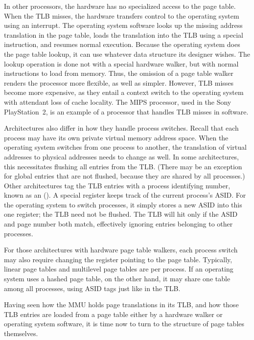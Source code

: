 In other processors, the hardware has no specialized access to the page
table.  When the TLB misses, the hardware transfers control to the
operating system using an interrupt.  The operating system software
looks up the missing address translation in the page table, loads the
translation into the TLB using a special instruction, and resumes
normal execution.  Because the operating system does the page table
lookup, it can use whatever data structure its designer wishes. The
lookup operation is done not with a special hardware walker, but with
normal instructions to load from memory.  Thus, the omission of a page
table walker renders the processor more flexible, as well as simpler.
However, TLB misses become more expensive, as they entail a context
switch to the operating system with attendant loss of cache locality.
The MIPS processor, used in the Sony PlayStation~2, is an example of
a processor that handles TLB misses in software.

Architectures also differ in how they handle process switches.  Recall
that each process may have its own private virtual memory address
space.  When the operating system switches from one process to
another, the translation of virtual addresses to physical addresses
needs to change as well.  In some architectures, this necessitates
flushing all entries from the TLB. (There may be an exception for
global entries that are not flushed, because they are shared by all
processes.)  Other architectures tag the TLB entries with a process
identifying number, known as an 
(). A special register keeps track of the current
process's ASID.  For the operating system to switch processes, it
simply stores a new ASID into this one register; the TLB need not be
flushed.  The TLB will hit only if the ASID and page number both
match, effectively ignoring entries belonging to other processes.

For those architectures with hardware page table walkers, each process
switch may also require changing the register pointing to the page
table.  Typically, linear page tables and multilevel page tables are
per process.  If an operating system uses a hashed page table, on the
other hand, it may share one table among all processes, using ASID
tags just like in the TLB.

Having seen how the MMU holds page translations in its TLB, and how
those TLB entries are loaded from a page table either by a hardware
walker or operating system software, it is time now to turn to the
structure of page tables themselves.

